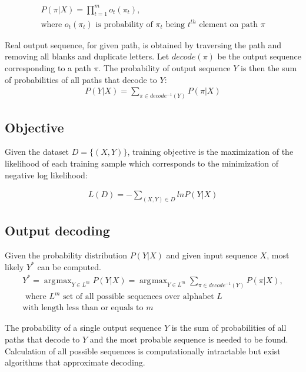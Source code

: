 \documentclass[times, utf8, diplomski, numeric, english]{fer}
\DeclareMathOperator*{\argmax}{\arg\!\max}
\begin{document}
\begin{equation}
\begin{gathered}
P(\pi | X) = \prod_{t=1}^{m} o_t(\pi_t), \\
\text{where $o_t(\pi_t)$ is probability of $\pi_t$ being $t^{th}$ element on path $\pi$}
\end{gathered}
\end{equation}

Real output sequence, for given path, is obtained by traversing the path and removing all blanks and duplicate letters. Let $ decode(\pi) $ be the output sequence corresponding to a path $\pi$. The probability of output sequence $Y$ is then the sum of probabilities of all paths that decode to $Y$:
\begin{equation}
\begin{gathered}
P(Y | X) = \sum_{\pi \in decode^{-1}(Y)}^{} P(\pi | X)
\end{gathered}
\end{equation}
\subsection{Objective}
Given the dataset $D = \{(X, Y)\}$, training objective is the maximization of the likelihood of each training sample which corresponds to the minimization of negative log likelihood:

\begin{equation}
\begin{gathered}
L(D) = - \sum_{(X,Y)\in D}^{} ln P(Y | X)
\end{gathered}
\end{equation}


\subsection{Output decoding}
Given the probability distribution $P(Y | X)$ and given input sequence $X$, most likely $Y^{*}$ can be computed.
\begin{equation}
\begin{gathered}
Y^{*} = \argmax_{Y \in L^m} P(Y|X) = \argmax_{Y \in L^m} \sum_{\pi \in decode^{-1}(Y)}^{} P(\pi | X),\\
\text{~where $L^m$ set of all possible sequences over alphabet $L$ }\\
\text{with length less than or equals to $m$}
\end{gathered}
\end{equation}

The probability of a single output sequence $Y$ is the sum of probabilities of all paths that decode to $Y$ and the most probable sequence is needed to be found.
Calculation of all possible sequences is computationally intractable but exist algorithms that approximate decoding. 
\end{document}
